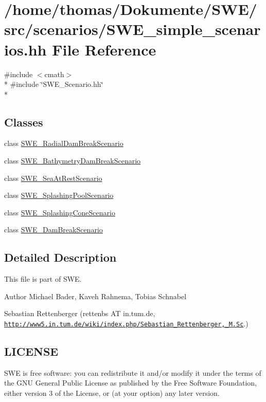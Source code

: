 \hypertarget{SWE__simple__scenarios_8hh}{\section{/home/thomas/\-Dokumente/\-S\-W\-E/src/scenarios/\-S\-W\-E\-\_\-simple\-\_\-scenarios.hh File Reference}
\label{SWE__simple__scenarios_8hh}
}
{\ttfamily \#include $<$cmath$>$}\\*
{\ttfamily \#include \char`\"{}S\-W\-E\-\_\-\-Scenario.\-hh\char`\"{}}\\*
\subsection*{Classes}
\begin{DoxyCompactItemize}
\item 
class \hyperlink{classSWE__RadialDamBreakScenario}{S\-W\-E\-\_\-\-Radial\-Dam\-Break\-Scenario}
\item 
class \hyperlink{classSWE__BathymetryDamBreakScenario}{S\-W\-E\-\_\-\-Bathymetry\-Dam\-Break\-Scenario}
\item 
class \hyperlink{classSWE__SeaAtRestScenario}{S\-W\-E\-\_\-\-Sea\-At\-Rest\-Scenario}
\item 
class \hyperlink{classSWE__SplashingPoolScenario}{S\-W\-E\-\_\-\-Splashing\-Pool\-Scenario}
\item 
class \hyperlink{classSWE__SplashingConeScenario}{S\-W\-E\-\_\-\-Splashing\-Cone\-Scenario}
\item 
class \hyperlink{classSWE__DamBreakScenario}{S\-W\-E\-\_\-\-Dam\-Break\-Scenario}
\end{DoxyCompactItemize}


\subsection{Detailed Description}
This file is part of S\-W\-E.

\begin{DoxyAuthor}{Author}
Michael Bader, Kaveh Rahnema, Tobias Schnabel 

Sebastian Rettenberger (rettenbs A\-T in.\-tum.\-de, \href{http://www5.in.tum.de/wiki/index.php/Sebastian_Rettenberger,_M.Sc}{\tt http\-://www5.\-in.\-tum.\-de/wiki/index.\-php/\-Sebastian\-\_\-\-Rettenberger,\-\_\-\-M.\-Sc}.)
\end{DoxyAuthor}
\hypertarget{Writer_8hh_LICENSE}{}\subsection{L\-I\-C\-E\-N\-S\-E}\label{Writer_8hh_LICENSE}
S\-W\-E is free software\-: you can redistribute it and/or modify it under the terms of the G\-N\-U General Public License as published by the Free Software Foundation, either version 3 of the License, or (at your option) any later version.

